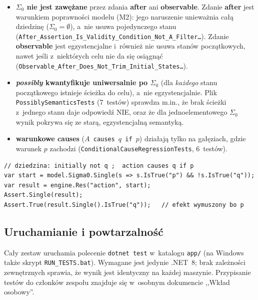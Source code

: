 \documentclass[11pt,a4paper]{article}
\begin{document}
\begin{itemize}
  \item \textbf{$\Sigma_0$ nie jest zawężane} przez zdania \textbf{after} ani
        \textbf{observable}. Zdanie \textbf{after} jest warunkiem poprawności
        modelu (M2): jego naruszenie unieważnia całą dziedzinę
        ($\Sigma_0=\emptyset$), a~nie usuwa pojedynczego stanu
        (\texttt{After\_Assertion\_Is\_Validity\_Condition\_Not\_A\_Filter\dots}).
        Zdanie \textbf{observable} jest egzystencjalne i~również nie usuwa
        stanów początkowych, nawet jeśli z~niektórych celu nie da się osiągnąć
        (\texttt{Observable\_After\_Does\_Not\_Trim\_Initial\_States\dots}).
  \item \textbf{\emph{possibly} kwantyfikuje uniwersalnie po $\Sigma_0$}
        (dla \emph{każdego} stanu początkowego istnieje ścieżka do celu),
        a~nie egzystencjalnie. Plik \texttt{PossiblySemanticsTests} (7~testów)
        sprawdza m.in., że brak ścieżki z~jednego stanu daje odpowiedź NIE,
        oraz że dla jednoelementowego $\Sigma_0$ wynik pokrywa się ze starą,
        egzystencjalną semantyką.
  \item \textbf{warunkowe \textbf{causes}} (\texttt{$A$ causes $q$ if $p$})
        działają tylko na gałęziach, gdzie warunek $p$ zachodzi
        (\texttt{ConditionalCauseRegressionTests}, 6~testów).
\end{itemize}

\begin{lstlisting}[style=ds4code, caption={Regresja: warunkowe causes na gałęzi, gdzie warunek p zachodzi}]
// dziedzina: initially not q ;  action causes q if p
var start = model.Sigma0.Single(s => s.IsTrue("p") && !s.IsTrue("q"));
var result = engine.Res("action", start);
Assert.Single(result);
Assert.True(result.Single().IsTrue("q"));   // efekt wymuszony bo p
\end{lstlisting}

\subsection{Uruchamianie i powtarzalność}

Cały zestaw uruchamia polecenie \texttt{dotnet test} w~katalogu \texttt{app/}
(na Windows także skrypt \texttt{RUN\_TESTS.bat}). Wymagane jest jedynie
.NET~8; brak zależności zewnętrznych sprawia, że wynik jest identyczny na
każdej maszynie. Przypisanie testów do członków zespołu znajduje się
w~osobnym dokumencie ,,Wkład osobowy''.
\end{document}
